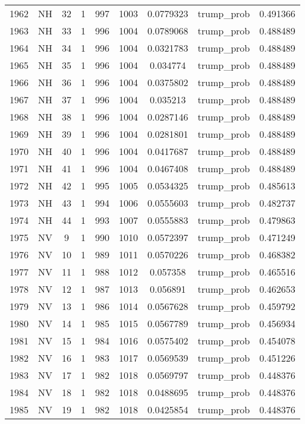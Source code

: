 \documentclass[12pt,a4paper]{article}
\begin{document}
\begin{tabular}{r|cccccccc}
	1962 & NH & 32 & 1 & 997 & 1003 & 0.0779323 & trump\_prob & 0.491366 \\
	1963 & NH & 33 & 1 & 996 & 1004 & 0.0789068 & trump\_prob & 0.488489 \\
	1964 & NH & 34 & 1 & 996 & 1004 & 0.0321783 & trump\_prob & 0.488489 \\
	1965 & NH & 35 & 1 & 996 & 1004 & 0.034774 & trump\_prob & 0.488489 \\
	1966 & NH & 36 & 1 & 996 & 1004 & 0.0375802 & trump\_prob & 0.488489 \\
	1967 & NH & 37 & 1 & 996 & 1004 & 0.035213 & trump\_prob & 0.488489 \\
	1968 & NH & 38 & 1 & 996 & 1004 & 0.0287146 & trump\_prob & 0.488489 \\
	1969 & NH & 39 & 1 & 996 & 1004 & 0.0281801 & trump\_prob & 0.488489 \\
	1970 & NH & 40 & 1 & 996 & 1004 & 0.0417687 & trump\_prob & 0.488489 \\
	1971 & NH & 41 & 1 & 996 & 1004 & 0.0467408 & trump\_prob & 0.488489 \\
	1972 & NH & 42 & 1 & 995 & 1005 & 0.0534325 & trump\_prob & 0.485613 \\
	1973 & NH & 43 & 1 & 994 & 1006 & 0.0555603 & trump\_prob & 0.482737 \\
	1974 & NH & 44 & 1 & 993 & 1007 & 0.0555883 & trump\_prob & 0.479863 \\
	1975 & NV & 9 & 1 & 990 & 1010 & 0.0572397 & trump\_prob & 0.471249 \\
	1976 & NV & 10 & 1 & 989 & 1011 & 0.0570226 & trump\_prob & 0.468382 \\
	1977 & NV & 11 & 1 & 988 & 1012 & 0.057358 & trump\_prob & 0.465516 \\
	1978 & NV & 12 & 1 & 987 & 1013 & 0.056891 & trump\_prob & 0.462653 \\
	1979 & NV & 13 & 1 & 986 & 1014 & 0.0567628 & trump\_prob & 0.459792 \\
	1980 & NV & 14 & 1 & 985 & 1015 & 0.0567789 & trump\_prob & 0.456934 \\
	1981 & NV & 15 & 1 & 984 & 1016 & 0.0575402 & trump\_prob & 0.454078 \\
	1982 & NV & 16 & 1 & 983 & 1017 & 0.0569539 & trump\_prob & 0.451226 \\
	1983 & NV & 17 & 1 & 982 & 1018 & 0.0569797 & trump\_prob & 0.448376 \\
	1984 & NV & 18 & 1 & 982 & 1018 & 0.0488695 & trump\_prob & 0.448376 \\
	1985 & NV & 19 & 1 & 982 & 1018 & 0.0425854 & trump\_prob & 0.448376 \\

\end{tabular}
\end{document}
